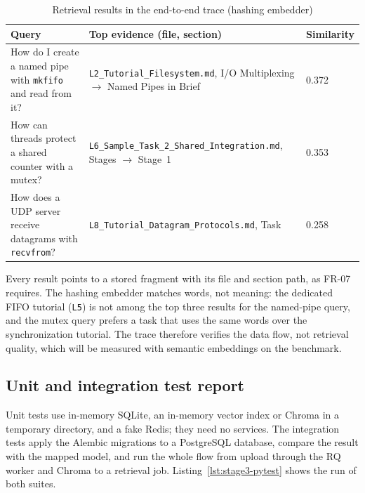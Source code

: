 \documentclass[12pt,a4paper]{article}
\begin{document}
\begin{table}[htbp]
\centering
\small
\renewcommand{\arraystretch}{1.3}
\begin{tabularx}{\textwidth}{|X|p{62mm}|p{17mm}|}
\hline
\textbf{Query} & \textbf{Top evidence (file, section)} & \textbf{Similarity} \\
\hline
How do I create a named pipe with \texttt{mkfifo} and read from it? &
\texttt{L2\_Tutorial\_Filesystem.md}, I/O Multiplexing
$\rightarrow$ Named Pipes in Brief & 0.372 \\
\hline
How can threads protect a shared counter with a mutex? &
\texttt{L6\_Sample\_Task\_2\_Shared\_Integration.md}, Stages
$\rightarrow$ Stage~1 & 0.353 \\
\hline
How does a UDP server receive datagrams with \texttt{recvfrom}? &
\texttt{L8\_Tutorial\_Datagram\_Protocols.md}, Task & 0.258 \\
\hline
\end{tabularx}
\caption{Retrieval results in the end-to-end trace (hashing embedder)}
\label{tab:stage3-queries}
\end{table}

Every result points to a stored fragment with its file and section
path, as FR-07 requires. The hashing embedder matches words, not
meaning: the dedicated FIFO tutorial (\texttt{L5}) is not among the
top three results for the named-pipe query, and the mutex query
prefers a task that uses the same words over the synchronization
tutorial. The trace therefore verifies the data flow, not retrieval
quality, which will be measured with semantic embeddings on the
benchmark.

\subsection{Unit and integration test report}
\label{sec:stage3-tests}

Unit tests use in-memory SQLite, an in-memory vector index or Chroma in
a temporary directory, and a fake Redis; they need no services. The
integration tests apply the Alembic migrations to a PostgreSQL
database, compare the result with the mapped model, and run the whole
flow from upload through the RQ worker and Chroma to a retrieval job.
Listing~\ref{lst:stage3-pytest} shows the run of both suites.
\end{document}
